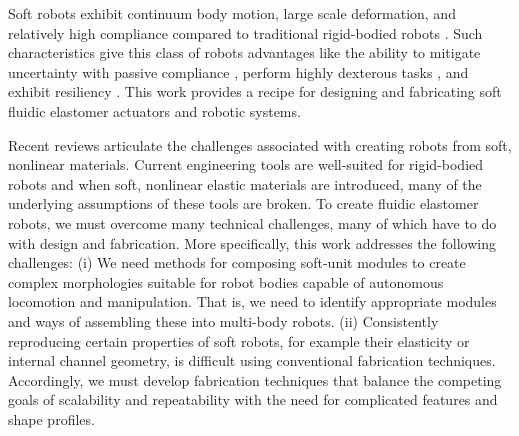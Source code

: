 Soft robots exhibit continuum body motion, large scale deformation, and relatively high compliance compared to traditional rigid-bodied robots \citep{trivedi2008soft}.
%
Such characteristics give this class of robots advantages like the ability to mitigate uncertainty with passive compliance \citep{mcmahan2006field}, perform highly dexterous tasks \citep{deimel2014novel}, and exhibit resiliency \citep{tolley2014resilient}.
%
This work provides a recipe for designing and fabricating soft fluidic elastomer actuators and robotic systems.

Recent reviews \citep{trivedi2008soft, trimmer2014journal, lipson2014challenges, majidi2014soft} articulate the challenges associated with creating robots from soft, nonlinear materials.
%
Current engineering tools are well-suited for rigid-bodied robots and when soft, nonlinear elastic materials are introduced, many of the underlying assumptions of these tools are broken.
%
To create fluidic elastomer robots, we must overcome many technical challenges, many of which have to do with design and fabrication.
%
More specifically, this work addresses the following challenges:
(i) We need methods for composing soft-unit modules to create complex morphologies suitable for robot bodies capable of autonomous locomotion and manipulation.
That is, we need to identify appropriate modules and ways of assembling these into multi-body robots.
(ii) Consistently reproducing certain properties of soft robots, for example their elasticity or internal channel geometry, is difficult using conventional fabrication techniques.
Accordingly, we must develop fabrication techniques that balance the competing goals of scalability and repeatability with the need for complicated features and shape profiles.

